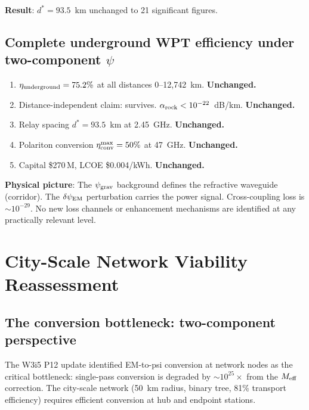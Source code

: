 \documentclass[11pt]{article}
\newcommand{\psigrav}{\psi_{\rm grav}}
\newcommand{\dpsiEM}{\delta\psi_{\rm EM}}
\newcommand{\Meff}{M_{\rm eff}}
\newcommand{\alpharock}{\alpha_{\rm rock}}
\begin{document}
\textbf{Result}: $d^* = 93.5$~km unchanged to 21 significant figures.

\subsection{Complete underground WPT efficiency under two-component $\psi$}

\begin{tcolorbox}[colback=green!5!white, colframe=green!60!black,
  title=\textbf{W3i6 Underground WPT: All Claims Survive Two-Component Decomposition}]
\begin{enumerate}[nosep]
\item $\eta_{\rm underground} = 75.2\%$ at all distances 0--12,742~km.
  \textbf{Unchanged.}
\item Distance-independent claim: survives. $\alpharock < 10^{-22}$~dB/km.
  \textbf{Unchanged.}
\item Relay spacing $d^* = 93.5$~km at 2.45~GHz. \textbf{Unchanged.}
\item Polariton conversion $\eta_{\rm conv}^{\rm max} = 50\%$ at 47~GHz.
  \textbf{Unchanged.}
\item Capital \$270\,M, LCOE \$0.004/kWh. \textbf{Unchanged.}
\end{enumerate}

\textbf{Physical picture}: The $\psigrav$ background defines the
refractive waveguide (corridor). The $\dpsiEM$ perturbation carries
the power signal. Cross-coupling loss is $\sim 10^{-29}$. No new
loss channels or enhancement mechanisms are identified at any
practically relevant level.
\end{tcolorbox}

\section{City-Scale Network Viability Reassessment}
\label{sec:city-network}

\subsection{The conversion bottleneck: two-component perspective}

The W3i5 P12 update identified EM-to-psi conversion at network nodes
as the critical bottleneck: single-pass conversion is degraded by
$\sim 10^{25}\times$ from the $\Meff$ correction. The city-scale network
(50~km radius, binary tree, 81\% transport efficiency) requires efficient
conversion at hub and endpoint stations.
\end{document}
